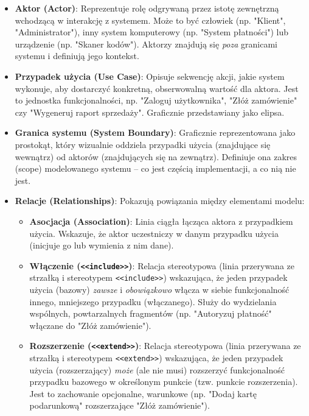 \documentclass[a4paper,12pt]{article}
\begin{document}
\begin{itemize}
    \item \textbf{Aktor (Actor)}: Reprezentuje rolę odgrywaną przez istotę zewnętrzną wchodzącą w interakcję z systemem. Może to być człowiek (np. "Klient", "Administrator"), inny system komputerowy (np. "System płatności") lub urządzenie (np. "Skaner kodów"). Aktorzy znajdują się \emph{poza} granicami systemu i definiują jego kontekst.

    \item \textbf{Przypadek użycia (Use Case)}: Opisuje sekwencję akcji, jakie system wykonuje, aby dostarczyć konkretną, obserwowalną wartość dla aktora. Jest to jednostka funkcjonalności, np. "Zaloguj użytkownika", "Złóż zamówienie" czy "Wygeneruj raport sprzedaży". Graficznie przedstawiany jako elipsa.

    \item \textbf{Granica systemu (System Boundary)}: Graficznie reprezentowana jako prostokąt, który wizualnie oddziela przypadki użycia (znajdujące się wewnątrz) od aktorów (znajdujących się na zewnątrz). Definiuje ona zakres (scope) modelowanego systemu -- co jest częścią implementacji, a co nią nie jest.

    \item \textbf{Relacje (Relationships)}: Pokazują powiązania między elementami modelu:
    \begin{itemize}
        \item \textbf{Asocjacja (Association)}: Linia ciągła łącząca aktora z przypadkiem użycia. Wskazuje, że aktor uczestniczy w danym przypadku użycia (inicjuje go lub wymienia z nim dane).
        
        \item \textbf{Włączenie (\texttt{<<include>>})}: Relacja stereotypowa (linia przerywana ze strzałką i stereotypem \texttt{<<include>>}) wskazująca, że jeden przypadek użycia (bazowy) \emph{zawsze} i \emph{obowiązkowo} włącza w siebie funkcjonalność innego, mniejszego przypadku (włączanego). Służy do wydzielania wspólnych, powtarzalnych fragmentów (np. "Autoryzuj płatność" włączane do "Złóż zamówienie").
        
        \item \textbf{Rozszerzenie (\texttt{<<extend>>})}: Relacja stereotypowa (linia przerywana ze strzałką i stereotypem \texttt{<<extend>>}) wskazująca, że jeden przypadek użycia (rozszerzający) \emph{może} (ale nie musi) rozszerzyć funkcjonalność przypadku bazowego w określonym punkcie (tzw. punkcie rozszerzenia). Jest to zachowanie opcjonalne, warunkowe (np. "Dodaj kartę podarunkową" rozszerzające "Złóż zamówienie").
        

\end{itemize}
\end{itemize}
\end{document}
